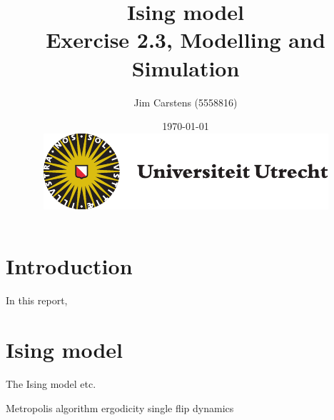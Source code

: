 \documentclass[a4paper]{article}
\title{\textbf{Ising model} \\\large{Exercise 2.3, Modelling and Simulation}}
\author{Jim Carstens (5558816)}
\date{\today \\ \includegraphics[scale=0.4]{uulogo.pdf}}
\begin{document}
\maketitle
\hrulefill
\tableofcontents
\hrulefill
\section*{Introduction}
In this report, 

\section{Ising model}  \label{sec:c}
The Ising model etc.

Metropolis algorithm
ergodicity single flip dynamics





\end{document}
